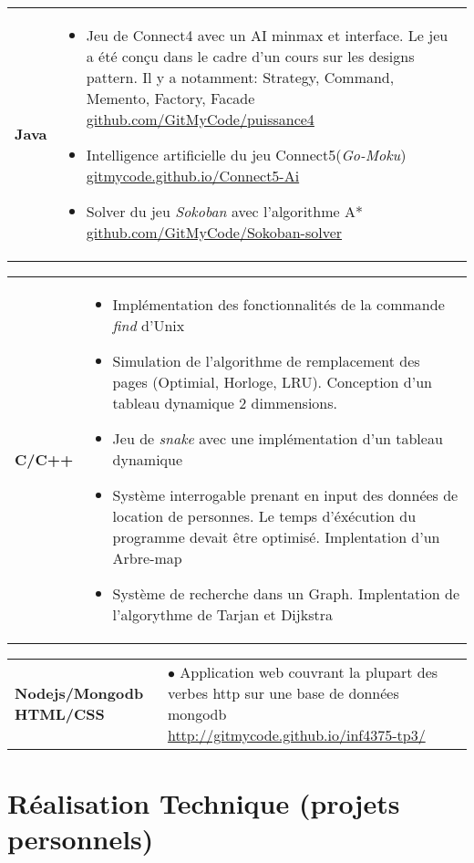 \documentclass[a4paper,10pt]{extarticle}
\makeatletter
\newlength{\indicewidth}%
\newlength{\separatorcolumnwidth}%
\newlength{\maincolumnwidth}%
\newlength{\spacecvline}%
\newcommand{\cvdetailitem}[3][\spacecvline]{
\noindent\begin{tabular}
{@{}p{\indicewidth}@{\hspace{\separatorcolumnwidth}} p{\maincolumnwidth}@{}}
	\raggedright{\bf{#2}} &{ #3}%
\end{tabular}%
\vspace{-0.9em}\par\addvspace{#1}  }
\newcommand{\cvdetaillist}[3][.25em]{}
\renewcommand{\cvdetaillist}[3][.25em]{%
  \cvdetailitem[#1]{#2}{#3}}
\makeatother
\begin{document}
\cvdetaillist{Java}{
\begin{itemize}
\item Jeu de Connect4 avec un AI minmax et interface. Le jeu a été conçu dans le cadre d'un cours sur les designs pattern. Il y a notamment: Strategy, Command, Memento, Factory, Facade \small \href{https://github.com/GitMyCode/puissance4}{github.com/GitMyCode/puissance4}
\item Intelligence artificielle du jeu Connect5(\textit{Go-Moku}) \small \href{http://gitmycode.github.io/Connect5-Ai/}{gitmycode.github.io/Connect5-Ai}

\item Solver du jeu \emph{Sokoban} avec l'algorithme A*  \small \href{https://github.com/GitMyCode/Sokoban-solver}{github.com/GitMyCode/Sokoban-solver}


\end{itemize}
}

\cvdetaillist{C/C++}{
\begin{itemize}
\item Implémentation des fonctionnalités de la commande \emph{find} d'Unix
\item Simulation de l'algorithme de remplacement des pages (Optimial, Horloge, LRU). Conception d'un tableau dynamique 2 dimmensions.

\item Jeu de \emph{snake} avec une implémentation d'un tableau dynamique
\item Système interrogable prenant en input des données de location de personnes. Le temps d'éxécution du programme devait être optimisé. Implentation d'un Arbre-map
\item Système de recherche dans un Graph. Implentation de l'algorythme de Tarjan et Dijkstra
\end{itemize}
}
\cvdetaillist{\small Nodejs/Mongodb HTML/CSS}{$\bullet$ Application web couvrant la plupart des verbes http sur une base de données mongodb   \newline\small{\href{http://gitmycode.github.io/inf4375-tp3/}{http://gitmycode.github.io/inf4375-tp3/}}}
\vspace{1em}\par











\section{Réalisation Technique \small(projets personnels)}
\end{document}
